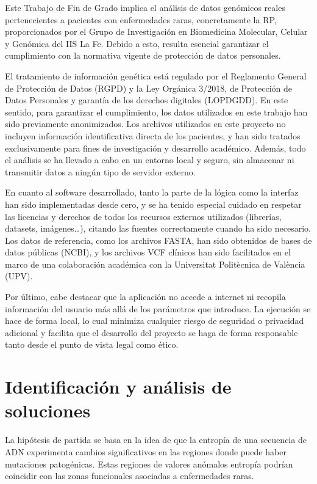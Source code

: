 \documentclass[11pt,spanish,listoffigures,listoftables]{tfgetsinf}
\begin{document}
Este Trabajo de Fin de Grado implica el análisis de datos genómicos reales pertenecientes a pacientes con enfermedades raras, concretamente la \acs{RP}, proporcionados por el Grupo de Investigación en Biomedicina Molecular, Celular y Genómica del \acs{IIS} La Fe. Debido a esto, resulta esencial garantizar el cumplimiento con la normativa vigente de protección de datos personales.

El tratamiento de información genética está regulado por el Reglamento General de Protección de Datos (\acs{RGPD}) y la Ley Orgánica 3/2018, de Protección de Datos Personales y garantía de los derechos digitales (\acs{LOPDGDD}). En este sentido, para garantizar el cumplimiento, los datos utilizados en este trabajo han sido previamente anonimizados. Los archivos utilizados en este proyecto no incluyen información identificativa directa de los pacientes, y han sido tratados exclusivamente para fines de investigación y desarrollo académico. Además, todo el análisis se ha llevado a cabo en un entorno local y seguro, sin almacenar ni transmitir datos a ningún tipo de servidor externo.

En cuanto al software desarrollado, tanto la parte de la lógica como la interfaz han sido implementadas desde cero, y se ha tenido especial cuidado en respetar las licencias y derechos de todos los recursos externos utilizados (librerías, datasets, imágenes…), citando las fuentes correctamente cuando ha sido necesario. Los datos de referencia, como los archivos FASTA, han sido obtenidos de bases de datos públicas (\acs{NCBI}), y los archivos \acs{VCF} clínicos han sido facilitados en el marco de una colaboración académica con la Universitat Politècnica de València (\acs{UPV}).

Por último, cabe destacar que la aplicación no accede a internet ni recopila información del usuario más allá de los parámetros que introduce. La ejecución se hace de forma local, lo cual minimiza cualquier riesgo de seguridad o privacidad adicional y facilita que el desarrollo del proyecto se haga de forma responsable tanto desde el punto de vista legal como ético.


\section{Identificación y análisis de soluciones}

La hipótesis de partida se basa en la idea de que la entropía de una secuencia de \acs{ADN} experimenta cambios significativos en las regiones donde puede haber mutaciones patogénicas. Estas regiones de valores anómalos entropía podrían coincidir con las zonas funcionales asociadas a enfermedades raras. 
\end{document}
